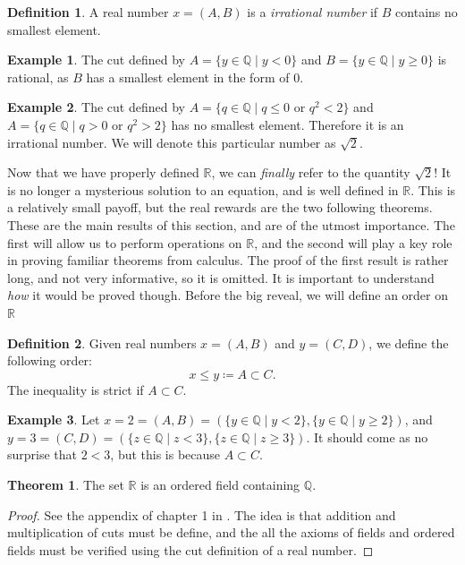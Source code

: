 \documentclass{article}
\newcommand{\R}{\mathbb{R}}
\newcommand{\Q}{\mathbb{Q}}
\theoremstyle{definition}
\newtheorem{theorem}{Theorem}[section]
\newtheorem{definition}{Definition}[section]
\newtheorem{example}{Example}[section]
\begin{document}
\begin{definition}
	A real number $ x=(A,B) $ is a \textit{\color{red}irrational number} if $ B $ contains no smallest element.
\end{definition}
\begin{example}
	The cut defined by $ A=\{y\in \Q \mid y<0\} $ and $ B=\{y\in\Q\mid y\ge 0\} $ is rational, as $ B $ has a smallest element in the form of $ 0 $.  
\end{example}
\begin{example}
	The cut defined by $A=\{q\in\Q\mid q\le 0\text{ or }q^2<2 \} $ and $ A=\{q\in\Q\mid q> 0\text{ or }q^2>2 \} $ has no smallest element. Therefore it is an irrational number. We will denote this particular number as $ \sqrt{2} $. 
\end{example}
Now that we have properly defined $ \R $, we can \textit{finally} refer to the quantity $ \sqrt{2} $! It is no longer a mysterious solution to an equation, and is well defined in $ \R $. This is a relatively small payoff, but the real rewards are the two following theorems. These are the main results of this section, and are of the utmost importance. The first will allow us to perform operations on $ \R $, and the second will play a key role in proving familiar theorems from calculus. The proof of the first result is rather long, and not very informative, so it is omitted. It is important to understand \textit{how} it would be proved though. Before the big reveal, we will define an order on $ \R $
\begin{definition}
	Given real numbers $ x=(A,B) $ and $ y=(C,D) $, we define the following order:$$x\le y\coloneqq A\subset C .$$ The inequality is strict if $ A\subset C $. 
\end{definition}
\begin{example}
	Let $ x=2=(A,B)=(\{y\in \Q \mid y<2\},\{y\in\Q\mid y\ge 2\})$, and $ y=3=(C,D)=(\{z\in \Q \mid z<3\},\{z\in\Q\mid z\ge 3\})$. It should come as no surprise that $ 2<3 $, but this is because $ A\subset C $.  
\end{example}
\begin{theorem}
	The set $ \R $ is an ordered field containing $ \Q $.
\end{theorem}
\begin{proof}
	See the appendix of chapter 1 in \cite{rudin}. The idea is that addition and multiplication of cuts must be define, and the all the axioms of fields and ordered fields must be verified using the cut definition of a real number. 
\end{proof}
\end{document}
